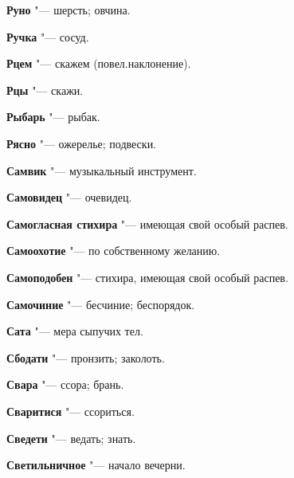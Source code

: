 \begin{mymulticols}{2}
\noindent\textbf{Руно} "--- шерсть; овчина. 




\noindent\textbf{Ручка} "--- сосуд. 




\noindent\textbf{Рцем} "--- скажем (повел.наклонение). 




\noindent\textbf{Рцы} "--- скажи. 




\noindent\textbf{Рыбарь} "--- рыбак. 




\noindent\textbf{Рясно} "--- ожерелье; подвески. 




\bukvaending






\noindent\textbf{Самвик} "--- музыкальный инструмент. 




\noindent\textbf{Самовидец} "--- очевидец. 




\noindent\textbf{Самогласная стихира} "--- имеющая свой особый распев. 




\noindent\textbf{Самоохотие} "--- по собственному желанию. 




\noindent\textbf{Самоподобен} "--- стихира, имеющая свой особый распев. 




\noindent\textbf{Самочиние} "--- бесчиние; беспорядок. 




\noindent\textbf{Сата} "--- мера сыпучих тел. 




\noindent\textbf{Сбодати} "--- пронзить; заколоть. 




\noindent\textbf{Свара} "--- ссора; брань. 




\noindent\textbf{Сваритися} "--- ссориться. 




\noindent\textbf{Сведети} "--- ведать; знать. 




\noindent\textbf{Светильничное} "--- начало вечерни. 





\end{mymulticols}

